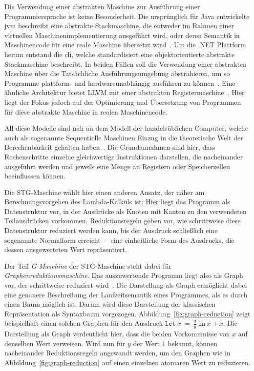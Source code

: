 Die Verwendung einer abstrakten Maschine zur Ausführung einer Programmiersprache ist keine Besonderheit.
Die ursprünglich für Java entwickelte \gls{jvm} beschreibt eine abstrakte Stackmaschine, die entweder im Rahmen einer virtuellen Maschinenimplementierung ausgeführt wird, oder deren Semantik in Maschinencode für eine reale Maschine übersetzt wird~\cite{JVM17}.
Um die .NET Plattform herum entstand die \gls{cli}, welche standardisiert eine objektorientierte abstrakte Stackmaschine beschreibt.
In beiden Fällen soll die Verwendung einer abstrakten Maschine über die Tatsächliche Ausführungsumgebung abstrahieren, um so Programme plattform- und hardwareunabhängig ausführen zu können~\cite{Miller_CommonLanguageInfrastructure}.
Eine ähnliche Architektur bietet LLVM mit einer abstrakten Registermaschine~\cite{LLVM}.
Hier liegt der Fokus jedoch auf der Optimierung und Übersetzung von Programmen für diese abstrakte Maschine in realen Maschinencode.

All diese Modelle sind nah an dem Modell der handelsüblichen Computer, welche auch als sogenannte Sequentielle Maschinen Einzug in die theoretische Welt der Berechenbarkeit gehalten haben~\cite{Slot_ProblemSpaceInvariance}.
Die Grundannahmen sind hier, dass Rechenschritte einzelne gleichwertige Instruktionen darstellen, die nacheinander ausgeführt werden und jeweils eine Menge an Registern oder Speicherzellen beeinflussen können.

Die STG-Maschine wählt hier einen anderen Ansatz, der näher am Berechnungsvorgehen des Lambda-Kalküls ist:
Hier liegt das Programm als Datenstruktur vor, in der Ausdrücke als Knoten mit Kanten zu den verwendeten Teilausdrücken vorkommen.
Reduktionsregeln geben vor, wie schrittweise diese Datenstruktur reduziert werden kann, bis der Ausdruck schließlich eine sogenannte Normalform erreicht~--~eine einheitliche Form des Ausdrucks, die dessen ausgewerteten Wert repräsentiert.

Der Teil \textit{G-Maschine} der STG-Maschine steht dabei für \textit{Graphenreduktionsmaschine}.
Das auszuwertende Programm liegt also als Graph vor, der schrittweise reduziert wird~\cite{Wadsworth_RelationComputationalDenotational}.
Die Darstellung als Graph ermöglicht dabei eine genauere Beschreibung der Laufzeitsemantik eines Programmes, als es durch einen Baum möglich ist.
Darum wird diese Darstellung der klassischen Repräsentation als Syntaxbaum vorgezogen.
Abbildung~\ref{fig:graph-reduction} zeigt beispielhaft einen solchen Graphen für den Ausdruck $\mathtt{let}\ x\ =\ \frac{2}{y}\ \mathtt{in}\ x + x$.
Die Darstellung als Graph verdeutlicht hier, dass die beiden Vorkommnisse von $x$ auf denselben Wert verweisen.
Wird nun für $y$ der Wert $1$ bekannt, können nacheinander Reduktionsregeln angewandt werden, um den Graphen wie in Abbildung~\ref{fig:graph-reduction} auf einen einzelnen atomaren Wert zu reduzieren.

